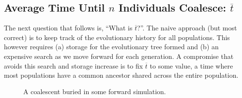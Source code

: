 \subsection{Average Time Until $n$ Individuals Coalesce: $\overbar{t}$}
\label{subsec:averageTimeUntilNIndividualsCoalesce}
The next question that follows is, ``What is $\overbar{t}$?''.
The naive approach (but most correct) is to keep track of the evolutionary history for all populations.
This however requires (a) storage for the evolutionary tree formed and (b) an expensive search as we move forward for
each generation.
A compromise that avoids this search and storage increase is to fix $\overbar{t}$ to some value, a time where most
populations have a common ancestor shared across the entire population.

\begin{figure}[t]
    \centering
    \subfloat{{  }}
    \qquad \qquad \qquad
    \subfloat{{  }}
    \caption{A coalescent buried in some forward simulation.}
    \label{fig:coalescentBuried}
\end{figure}

